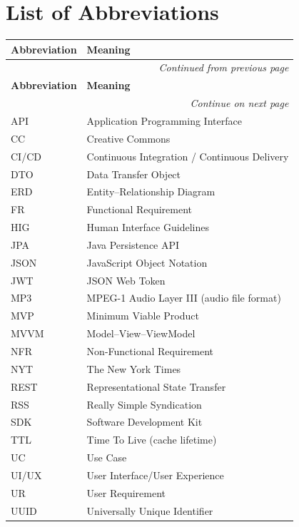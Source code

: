 \chapter*{List of Abbreviations}

\begin{longtable}{|p{3cm}|p{10cm}|}
\hline
\textbf{Abbreviation} & \textbf{Meaning} \\
\hline
\endfirsthead
\multicolumn{2}{r}{\textit{Continued from previous page}}\\[-2pt]\hline
\textbf{Abbreviation} & \textbf{Meaning} \\
\hline
\endhead
\multicolumn{2}{r}{\textit{Continue on next page}}\\
\endfoot
\endlastfoot
API & Application Programming Interface \\
\hline
CC & Creative Commons \\
\hline
CI/CD & Continuous Integration / Continuous Delivery \\
\hline
DTO & Data Transfer Object \\
\hline
ERD & Entity--Relationship Diagram \\
\hline
FR & Functional Requirement \\
\hline
HIG & Human Interface Guidelines \\
\hline
JPA & Java Persistence API \\
\hline
JSON & JavaScript Object Notation \\
\hline
JWT & JSON Web Token \\
\hline
MP3 & MPEG-1 Audio Layer III (audio file format) \\
\hline
MVP & Minimum Viable Product \\
\hline
MVVM & Model--View--ViewModel \\
\hline
NFR & Non-Functional Requirement \\
\hline
NYT & The New York Times \\
\hline
REST & Representational State Transfer \\
\hline
RSS & Really Simple Syndication \\
\hline
SDK & Software Development Kit \\
\hline
TTL & Time To Live (cache lifetime) \\
\hline
UC & Use Case \\
\hline
UI/UX & User Interface/User Experience \\
\hline
UR & User Requirement \\
\hline
UUID & Universally Unique Identifier \\
\hline
\end{longtable}
